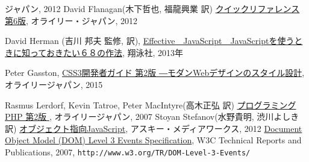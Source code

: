 \begin{thebibliography}{99}
	 ジャパン, 2012
 David Flanagan(木下哲也, 福龍興業 訳) 
            \href{http://www.amazon.co.jp/JavaScriptリファレンス-第6版-David-Flanagan/dp/4873115531/ref=sr_1_11?ie=UTF8&qid=1353802698&sr=8-11}
{\JS{} クイックリファレンス 第6版}, オライリー・ジャパン, 2012
\iffalse
 \bibitem{geroimenko}
Vladimir Geroimenko, Chaomei Chen(Ed.),\\
\href{http://www.amazon.co.jp/exec/obidos/ASIN/1852337907/qid=1146667282/sr=1-1/ref=sr_1_10_1/249-3353534-4529100}
   {\it Visualizing
	Information Using SVG and X3D: XML-based Technologies For The
	XML-based Web}, Springer Verlag 2005
\fi
{}David Herman (吉川 邦夫 監修, 訳),
\href{http://www.amazon.co.jp/Effective-JavaScript-JavaScript%E3%82%92%E4%BD%BF%E3%81%86%E3%81%A8%E3%81%8D%E3%81%AB%E7%9F%A5%E3%81%A3%E3%81%A6%E3%81%8A%E3%81%8D%E3%81%9F%E3%81%8468%E3%81%AE%E5%86%B4%E3%81%88%E3%81%9F%E3%82%84%E3%82%8A%E6%96%B9-David-Herman/dp/4798131113/ref=sr_1_1?ie=UTF8&qid=1365329955&sr=8-1&keywords=JavaScript%E3%82%92%E4%BD%BF%E3%81%86%E3%81%A8%E3%81%8D%E3%81%AB%E7%9F%A5%E3%81%A3%E3%81%A6%E3%81%8A%E3%81%8D%E3%81%9F%E3%81%84%EF%BC%96%EF%BC%98}
{Effective　JavaScript　JavaScriptを使うときに知っておきたい６８の作法}, 
翔泳社, 2013年

 Peter Gasston,
				 \href{https://www.amazon.co.jp/s/ref=nb_sb_ss_i_5_4/351-1343008-2819052?__mk_ja_JP=%E3%82%AB%E3%82%BF%E3%82%AB%E3%83%8A&url=search-alias%3Daps&field-keywords=css3%E9%96%8B%E7%99%BA%E8%80%85%E3%82%AC%E3%82%A4%E3%83%89&sprefix=css3%2Caps%2C226&crid=2KO0TT8P0FOGT}{CSS3開発者ガイド 第2版 ―モダンWebデザインのスタイル設計},
				 オライリージャパン, 2015

Rasmus Lerdorf, Kevin Tatroe, Peter MacIntyre(高木正弘 訳)
\href{http://www.amazon.co.jp/プログラミングPHP-第2版-Rasmus-Lerdorf/dp/4873113423/ref=sr_1_6?ie=UTF8&s=gateway&qid=1202533375&sr=8-6}
{プログラミングPHP 第2版 },  オライリージャパン, 2007
Stoyan Stefanov(水野貴明, 渋川よしき 訳)
\href{http://www.amazon.co.jp/オブジェクト指向
	JavaScript-Stoyan-Stefanov/dp/4048706705/ref=sr_1_1?ie=UTF8&qid=1353803180&sr=8-1}
{オブジェクト指向JavaScript}, アスキー・メディアワークス, 2012
\href{http://www.w3.org/TR/2007/DOM-Level-3-Events-20071221/}
{Document Object Model (DOM) Level 3 Events Specification},
    W3C Technical Reports and Publications, 2007,
\texttt{http://www.w3.org/TR/DOM-Level-3-Events/}


\end{thebibliography}
